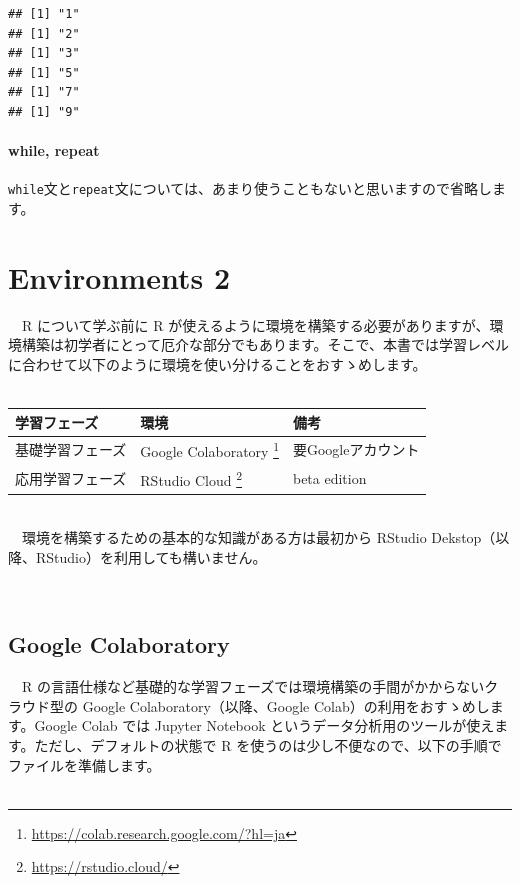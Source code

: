 \documentclass[
  12pt,
]{book}
\DeclareRobustCommand{\href}[2]{#2\footnote{\url{#1}}}
\begin{document}
\begin{verbatim}
## [1] "1"
## [1] "2"
## [1] "3"
## [1] "5"
## [1] "7"
## [1] "9"
\end{verbatim}

\hypertarget{while-repeat}{%
\subsubsection{while, repeat}\label{while-repeat}}

\texttt{while}文と\texttt{repeat}文については、あまり使うこともないと思いますので省略します。

\hypertarget{environments-2}{%
\chapter{Environments 2}\label{environments-2}}

　R について学ぶ前に R が使えるように環境を構築する必要がありますが、環境構築は初学者にとって厄介な部分でもあります。そこで、本書では学習レベルに合わせて以下のように環境を使い分けることをおすゝめします。\\
　

\begin{longtable}[]{@{}lll@{}}
\toprule
学習フェーズ & 環境 & 備考 \\
\midrule
\endhead
基礎学習フェーズ & \href{https://colab.research.google.com/?hl=ja}{Google Colaboratory } & 要Googleアカウント \\
応用学習フェーズ & \href{https://rstudio.cloud/}{RStudio Cloud } & beta edition \\
\bottomrule
\end{longtable}

　\\
　環境を構築するための基本的な知識がある方は最初から RStudio Dekstop（以降、RStudio）を利用しても構いません。

　

\hypertarget{google-colaboratory}{%
\section{Google Colaboratory}\label{google-colaboratory}}

　R の言語仕様など基礎的な学習フェーズでは環境構築の手間がかからないクラウド型の Google Colaboratory（以降、Google Colab）の利用をおすゝめします。Google Colab では Jupyter Notebook というデータ分析用のツールが使えます。ただし、デフォルトの状態で R を使うのは少し不便なので、以下の手順でファイルを準備します。\\
　
\end{document}
